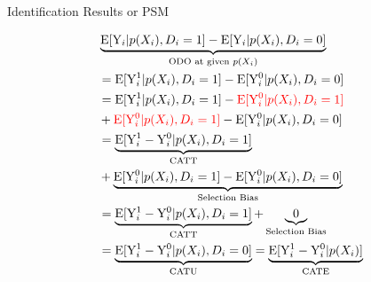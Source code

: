 \documentclass[hyperref={pdfpagelabels=false}]{beamer}
\begin{document}
\begin{frame}{Identification Results or PSM}
	\begin{itemize}	
			
	\begin{equation*}
	\begin{aligned}
& 
	\underbrace{\mathrm{E}[\mathrm{Y}_{i}|p(X_{i}),D_{i}=1] - \mathrm{E}[\mathrm{Y}_{i}|p(X_{i}),D_{i}=0]}_{\text{ODO at given $p(X_{i})$}}  \\
	&=\mathrm{E}[\mathrm{Y}^{1}_{i}|p(X_{i}),D_{i}=1] - \mathrm{E}[\mathrm{Y}^{0}_{i}|p(X_{i}),D_{i}=0] \\
	&= \mathrm{E}[\mathrm{Y}^{1}_{i}|p(X_{i}),D_i=1]-{\color{red} \mathrm{E}[\mathrm{Y}^{0}_{i}|p(X_{i}),D_i=1]} 
	\\
	& + {\color{red} \mathrm{E}[\mathrm{Y}^{0}_{i}|p(X_{i}),D_i=1]}-\mathrm{E}[\mathrm{Y}^{0}_{i}|p(X_{i}),D_i=0] \\
	&= \underbrace{\mathrm{E}[\mathrm{Y}^{1}_{i}-\mathrm{Y}^{0}_{i}|p(X_{i}),D_i=1]}_{\text{CATT}} \\
	&+ \underbrace{\mathrm{E}[\mathrm{Y}^{0}_{i}|p(X_{i}),D_i=1]-\mathrm{E}[\mathrm{Y}^{0}_{i}|p(X_{i}),D_i=0]}_{\text{Selection Bias}} \\
	&= \underbrace{\mathrm{E}[\mathrm{Y}^{1}_{i}-\mathrm{Y}^{0}_{i}|p(X_{i}),D_i=1]}_{\text{CATT}} + \underbrace{0}_{\text{Selection Bias}} \\
		&= \underbrace{\mathrm{E}[\mathrm{Y}^{1}_{i}-\mathrm{Y}^{0}_{i}|p(X_{i}),D_i=0]}_{\text{CATU}}= \underbrace{\mathrm{E}[\mathrm{Y}^{1}_{i}-\mathrm{Y}^{0}_{i}|p(X_{i})]}_{\text{CATE}}
	
	\end{aligned}
	\end{equation*}	
	
	\end{itemize}
	
\end{frame}
\end{document}
